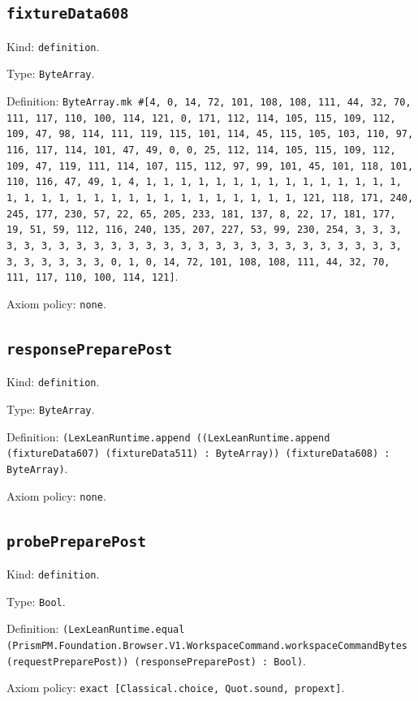 \documentclass[11pt]{article}
\begin{document}
\subsection*{\texttt{fixtureData608}}
\noindent Kind: \texttt{definition}.\par
\noindent Type: \texttt{ByteArray}.\par
\noindent Definition: \texttt{ByteArray.mk \#[4, 0, 14, 72, 101, 108, 108, 111, 44, 32, 70, 111, 117, 110, 100, 114, 121, 0, 171, 112, 114, 105, 115, 109, 112, 109, 47, 98, 114, 111, 119, 115, 101, 114, 45, 115, 105, 103, 110, 97, 116, 117, 114, 101, 47, 49, 0, 0, 25, 112, 114, 105, 115, 109, 112, 109, 47, 119, 111, 114, 107, 115, 112, 97, 99, 101, 45, 101, 118, 101, 110, 116, 47, 49, 1, 4, 1, 1, 1, 1, 1, 1, 1, 1, 1, 1, 1, 1, 1, 1, 1, 1, 1, 1, 1, 1, 1, 1, 1, 1, 1, 1, 1, 1, 1, 1, 1, 1, 121, 118, 171, 240, 245, 177, 230, 57, 22, 65, 205, 233, 181, 137, 8, 22, 17, 181, 177, 19, 51, 59, 112, 116, 240, 135, 207, 227, 53, 99, 230, 254, 3, 3, 3, 3, 3, 3, 3, 3, 3, 3, 3, 3, 3, 3, 3, 3, 3, 3, 3, 3, 3, 3, 3, 3, 3, 3, 3, 3, 3, 3, 3, 3, 0, 1, 0, 14, 72, 101, 108, 108, 111, 44, 32, 70, 111, 117, 110, 100, 114, 121]}.\par
\noindent Axiom policy: \texttt{none}.\par
\subsection*{\texttt{responsePreparePost}}
\noindent Kind: \texttt{definition}.\par
\noindent Type: \texttt{ByteArray}.\par
\noindent Definition: \texttt{(LexLeanRuntime.append ((LexLeanRuntime.append (fixtureData607) (fixtureData511) : ByteArray)) (fixtureData608) : ByteArray)}.\par
\noindent Axiom policy: \texttt{none}.\par
\subsection*{\texttt{probePreparePost}}
\noindent Kind: \texttt{definition}.\par
\noindent Type: \texttt{Bool}.\par
\noindent Definition: \texttt{(LexLeanRuntime.equal (PrismPM.Foundation.Browser.V1.WorkspaceCommand.workspaceCommandBytes (requestPreparePost)) (responsePreparePost) : Bool)}.\par
\noindent Axiom policy: \texttt{exact [Classical.choice, Quot.sound, propext]}.\par
\end{document}
